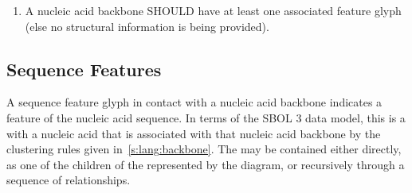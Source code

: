 \begin{enumerate}
\item A nucleic acid backbone SHOULD have at least one associated feature glyph (else no structural information is being provided).
\end{enumerate}


\subsection{Sequence Features}
\label{s:lang:nacomponent}

A sequence feature glyph in contact with a nucleic acid backbone indicates a feature of the nucleic acid sequence.
% 
In terms of the SBOL 3 data model, this is a  with a nucleic acid  that is associated with that nucleic acid backbone by the clustering rules given in~\ref{s:lang:backbone}.
The  may be contained either directly, as one of the children of the  represented by the diagram, or recursively through a sequence of  relationships.

